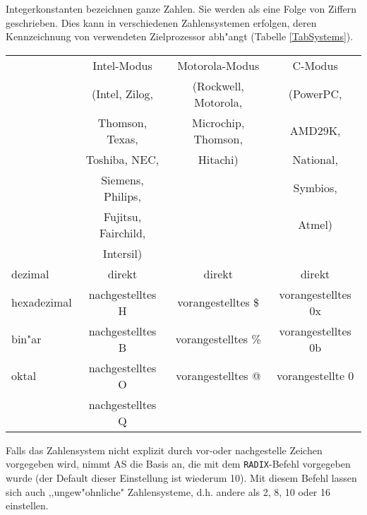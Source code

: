 \documentclass[12pt,a4paper,twoside]{report}
\begin{document}
Integerkonstanten bezeichnen ganze Zahlen.  Sie werden als eine
Folge von Ziffern geschrieben.  Dies kann in verschiedenen
Zahlensystemen erfolgen, deren Kennzeichnung von verwendeten
Zielprozessor abh"angt (Tabelle
\ref{TabSystems}).
\par
\begin{table*}[htbp]
\begin{center}\begin{tabular}{|l|c|c|c|}
\hline
            & Intel-Modus      & Motorola-Modus       &   C-Modus  \\
            & (Intel, Zilog,   & (Rockwell, Motorola, &  (PowerPC, \\
            & Thomson, Texas,  &  Microchip, Thomson, &   AMD29K,  \\
            & Toshiba, NEC,    &  Hitachi)            &   National,\\
            & Siemens, Philips, &                     &   Symbios, \\
            & Fujitsu, Fairchild, &                   &   Atmel)   \\
            & Intersil)        &                      &            \\
\hline
\hline
dezimal     & direkt           & direkt               & direkt \\
hexadezimal & nachgestelltes H & vorangestelltes \$   & vorangestelltes 0x \\
bin"ar      & nachgestelltes B & vorangestelltes \%   & vorangestelltes 0b \\
oktal       & nachgestelltes O & vorangestelltes @    & vorangestellte 0 \\
            & nachgestelltes Q &                      &                  \\
\hline
\end{tabular}\end{center}
\caption{m"ogliche Zahlensysteme\label{TabSystems}}
\end{table*}
Falls das Zahlensystem nicht explizit durch vor-oder nachgestelle Zeichen
vorgegeben wird, nimmt AS die Basis an, die mit dem {\tt RADIX}-Befehl
vorgegeben wurde (der Default dieser Einstellung ist wiederum 10).  Mit
diesem Befehl lassen sich auch ,,ungew"ohnliche" Zahlensysteme, d.h.
andere als 2, 8, 10 oder 16 einstellen.
\end{document}
